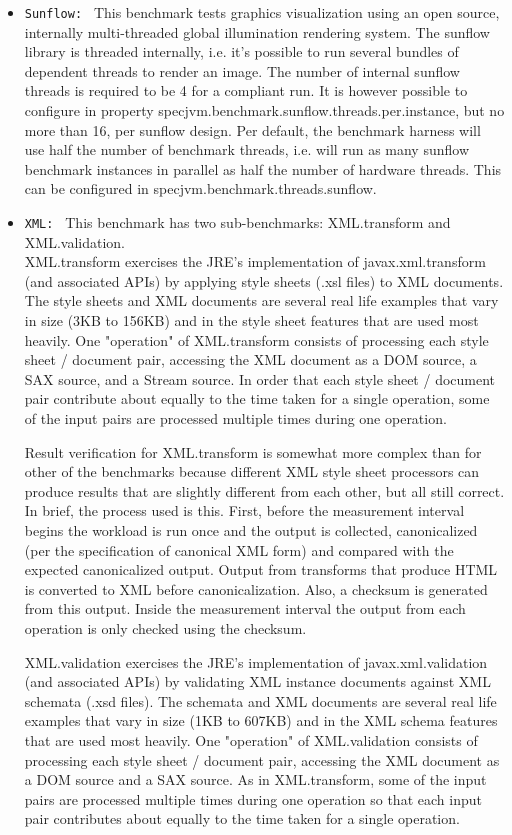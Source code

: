 \begin{itemize}
\item \texttt{Sunflow: } This benchmark tests graphics visualization using an open source, internally multi-threaded global illumination rendering system. The sunflow library is threaded internally, i.e. it's possible to run several bundles of dependent threads to render an image. The number of internal sunflow threads is required to be 4 for a compliant run. It is however possible to configure in property specjvm.benchmark.sunflow.threads.per.instance, but no more than 16, per sunflow design. Per default, the benchmark harness will use half the number of benchmark threads, i.e. will run as many sunflow benchmark instances in parallel as half the number of hardware threads. This can be configured in specjvm.benchmark.threads.sunflow.
\item \texttt{XML: } This benchmark has two sub-benchmarks: XML.transform and XML.validation.
\\XML.transform exercises the JRE's implementation of javax.xml.transform (and associated APIs) by applying style sheets (.xsl files) to XML documents. The style sheets and XML documents are several real life examples that vary in size (3KB to 156KB) and in the style sheet features that are used most heavily. One "operation" of XML.transform consists of processing each style sheet / document pair, accessing the XML document as a DOM source, a SAX source, and a Stream source. In order that each style sheet / document pair contribute about equally to the time taken for a single operation, some of the input pairs are processed multiple times during one operation.

Result verification for XML.transform is somewhat more complex than for other of the benchmarks because different XML style sheet processors can produce results that are slightly different from each other, but all still correct. In brief, the process used is this. First, before the measurement interval begins the workload is run once and the output is collected, canonicalized (per the specification of canonical XML form) and compared with the expected canonicalized output. Output from transforms that produce HTML is converted to XML before canonicalization. Also, a checksum is generated from this output. Inside the measurement interval the output from each operation is only checked using the checksum.

XML.validation exercises the JRE's implementation of javax.xml.validation (and associated APIs) by validating XML instance documents against XML schemata (.xsd files). The schemata and XML documents are several real life examples that vary in size (1KB to 607KB) and in the XML schema features that are used most heavily. One "operation" of XML.validation consists of processing each style sheet / document pair, accessing the XML document as a DOM source and a SAX source. As in XML.transform, some of the input pairs are processed multiple times during one operation so that each input pair contributes about equally to the time taken for a single operation. 
\end{itemize}

